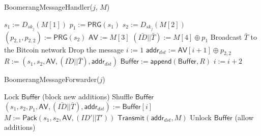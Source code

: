 \begin{algorithm}[t!]
\caption{{\sf BoomerangMessageHandler}($j$, $M$)}
\label{alg:handler}
\begin{algorithmic}[1]

\State $s_1 := D_{sk_{j}}(M[1])$
\State $p_1 := \mathsf{PRG}(s_1)$
\State $s_2 := D_{sk_{j}}(M[2])$
\State $(p_{2,1}, p_{2,2}) := \mathsf{PRG}(s_2)$
\State $\mathsf{AV} := M[3]$
\State $(\bar{ID} || \bar{T}) := M[4] \oplus p_1$
	\State Broadcast $\bar{T}$ to the Bitcoin network
	\State Drop the message
\Else
	\State $i := 1$
			\State $\mathsf{addr}_{dst} := \mathsf{AV}[i+1] \oplus p_{2,2}$
			\State $R := (s_1, s_2, \mathsf{AV}, (\bar{ID} || \bar{T}), \mathsf{addr}_{dst})$
			\State $\mathsf{Buffer} := \mathsf{append}(\mathsf{Buffer}, R)$
		\Else
			\State $i := i + 2$
		\EndIf
	\EndWhile
\EndIf

\end{algorithmic}
\end{algorithm}

\begin{algorithm}[t!]
\caption{{\sf BoomerangMessageForwarder}($j$)}
\label{alg:handler}
\begin{algorithmic}[1]

\State Lock $\mathsf{Buffer}$ (block new additions)
\State Shuffle $\mathsf{Buffer}$
	\State $(s_1, s_2, p_1, \mathsf{AV}, (\bar{ID} || \bar{T}), \mathsf{addr}_{dst}) := \mathsf{Buffer}[i]$
	\State $M := \mathsf{Pack}(s_1, s_2, \mathsf{AV}, (ID' || T'))$
	\State $\mathsf{Transmit}(\mathsf{addr}_{dst}, M)$
\EndFor
\State Unlock $\mathsf{Buffer}$ (allow additions)


\end{algorithmic}
\end{algorithm}


